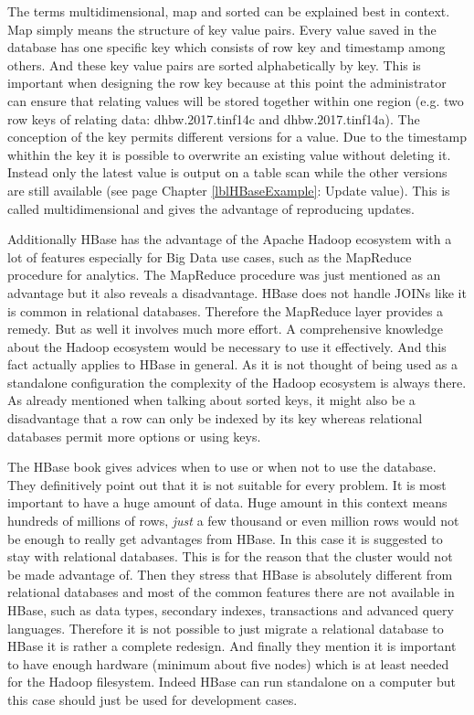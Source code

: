 The terms multidimensional, map and sorted can be explained best in context. Map simply means the structure of key value pairs. Every value saved in the database has one specific key which consists of row key and timestamp among others. And these key value pairs are sorted alphabetically by key. This is important when designing the row key because at this point the administrator can ensure that relating values will be stored together within one region (e.g. two row keys of relating data: dhbw.2017.tinf14c and dhbw.2017.tinf14a). \cite{hbase.wilson.2008}
The conception of the key permits different versions for a value. Due to the timestamp whithin the key it is possible to overwrite an existing value without deleting it. Instead only the latest value is output on a table scan while the other versions are still available (see page \pageref{lblHBaseExample} Chapter \ref{lblHBaseExample}:  Update value). This is called multidimensional and gives the advantage of reproducing updates. \cite{hbase.achari.2015}

Additionally HBase has the advantage of the Apache Hadoop ecosystem with a lot of features especially for Big Data use cases, such as the MapReduce procedure for analytics. \cite{hbase.shriparv.2014}
The MapReduce procedure was just mentioned as an advantage but it also reveals a disadvantage. HBase does not handle JOINs like it is common in relational databases. Therefore the MapReduce layer provides a remedy. But as well it involves much more effort. A comprehensive knowledge about the Hadoop ecosystem would be necessary to use it effectively. And this fact actually applies to HBase in general. As it is not thought of being used as a standalone configuration the complexity of the Hadoop ecosystem is always there.
 As already mentioned when talking about sorted keys, it might also be a disadvantage that a row can only be indexed by its key whereas relational databases permit more options or using keys. \cite{hbase.shriparv.2014}

The HBase book \cite{hbase.apache.foundation.2017} gives advices when to use or when not to use the database. They definitively point out that it is not suitable for every problem. It is most important to have a huge amount of data. Huge amount in this context means hundreds of millions of rows, \textit{just} a few thousand or even million rows would not be enough to really get advantages from HBase. In this case it is suggested to stay with relational databases. This is for the reason that the cluster would not be made advantage of.
Then they stress that HBase is absolutely different from relational databases and most of the common features there are not available in HBase, such as data types, secondary indexes, transactions and advanced query languages. Therefore it is not possible to just migrate a relational database to HBase it is rather a complete redesign.
And finally they mention it is important to have enough hardware (minimum about five nodes) which is at least needed for the Hadoop filesystem. Indeed HBase can run standalone on a computer but this case should just be used for development cases. \cite{hbase.apache.foundation.2017}

